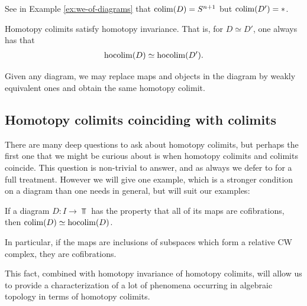 \begin{exercise} See in Example \ref{ex:we-of-diagrams} that $\mathop{\operatorname*{colim}}(D) = S^{n+1}$ but $\mathop{\operatorname*{colim}}(D') = \ast$.
\end{exercise}

\begin{theorem} Homotopy colimits satisfy homotopy invariance. That is, for $D\simeq D'$, one always has that
\begin{align*}
    \mathop{\operatorname*{hocolim}}(D) \simeq \mathop{\operatorname*{hocolim}}(D').
\end{align*}
\end{theorem}

\begin{corollary} Given any diagram, we may replace maps and objects in the diagram by weakly equivalent ones and obtain the same homotopy colimit.
\end{corollary}


\subsection{Homotopy colimits coinciding with colimits}

There are many deep questions to ask about homotopy colimits, but perhaps the first one that we might be curious about is when homotopy colimits and colimits coincide. This question is non-trivial to answer, and as always we defer to \cite{Dugger} for a full treatment. However we will give one example, which is a stronger condition on a diagram than one needs in general, but will suit our examples:

\begin{proposition} If a diagram $D: I \to \Top$ has the property that all of its maps are cofibrations, then $\mathop{\operatorname*{colim}}(D) \simeq \mathop{\operatorname*{hocolim}}(D)$.
\end{proposition}

In particular, if the maps are inclusions of subspaces which form a relative CW complex, they are cofibrations.

This fact, combined with homotopy invariance of homotopy colimits, will allow us to provide a characterization of a lot of phenomena occurring in algebraic topology in terms of homotopy colimits.

